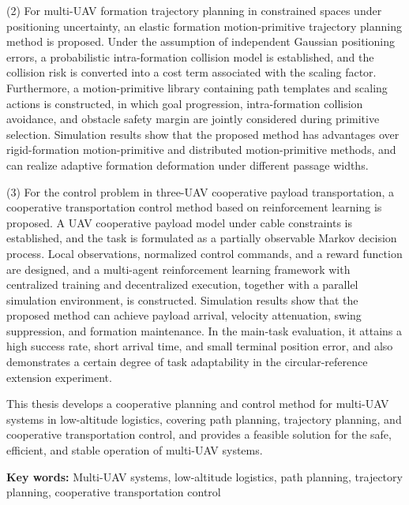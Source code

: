 (2) For multi-UAV formation trajectory planning in constrained spaces under positioning uncertainty, an elastic formation motion-primitive trajectory planning method is proposed. Under the assumption of independent Gaussian positioning errors, a probabilistic intra-formation collision model is established, and the collision risk is converted into a cost term associated with the scaling factor. Furthermore, a motion-primitive library containing path templates and scaling actions is constructed, in which goal progression, intra-formation collision avoidance, and obstacle safety margin are jointly considered during primitive selection. Simulation results show that the proposed method has advantages over rigid-formation motion-primitive and distributed motion-primitive methods, and can realize adaptive formation deformation under different passage widths.

(3) For the control problem in three-UAV cooperative payload transportation, a cooperative transportation control method based on reinforcement learning is proposed. A UAV cooperative payload model under cable constraints is established, and the task is formulated as a partially observable Markov decision process. Local observations, normalized control commands, and a reward function are designed, and a multi-agent reinforcement learning framework with centralized training and decentralized execution, together with a parallel simulation environment, is constructed. Simulation results show that the proposed method can achieve payload arrival, velocity attenuation, swing suppression, and formation maintenance. In the main-task evaluation, it attains a high success rate, short arrival time, and small terminal position error, and also demonstrates a certain degree of task adaptability in the circular-reference extension experiment.

This thesis develops a cooperative planning and control method for multi-UAV systems in low-altitude logistics, covering path planning, trajectory planning, and cooperative transportation control, and provides a feasible solution for the safe, efficient, and stable operation of multi-UAV systems.

\noindent\textbf{Key words:} Multi-UAV systems, low-altitude logistics, path planning, trajectory planning, cooperative transportation control
